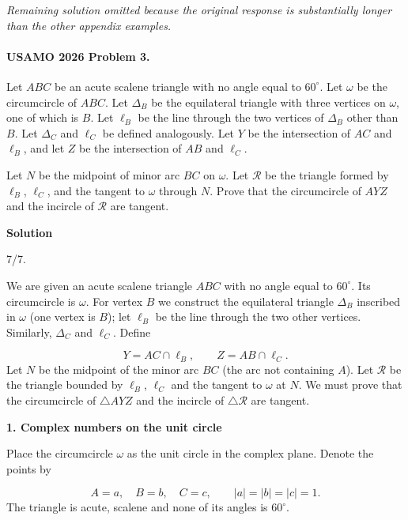\documentclass{llmxive}
\providecommand{\solutionheading}[1]{\par\smallskip\noindent\textbf{#1}\par}
\begin{document}
\par\noindent\textit{Remaining solution omitted because the original response is substantially longer than the other appendix examples.}\par
\par


\paragraph{USAMO 2026 Problem 3.}
\begin{mdframed}[style=mdpurplebox,frametitle={USAMO 2026 Problem 3}]
Let $ABC$ be an acute scalene triangle with no angle equal to $60^\circ$. Let $\omega$ be the circumcircle of $ABC$. Let $\Delta_B$ be the equilateral triangle with three vertices on $\omega$, one of which is $B$. Let $\ell_B$ be the line through the two vertices of $\Delta_B$ other than $B$. Let $\Delta_C$ and $\ell_C$ be defined analogously. Let $Y$ be the intersection of $AC$ and $\ell_B$, and let $Z$ be the intersection of $AB$ and $\ell_C$.

Let $N$ be the midpoint of minor arc $BC$ on $\omega$. Let $\mathcal{R}$ be the triangle formed by $\ell_B$, $\ell_C$, and the tangent to $\omega$ through $N$. Prove that the circumcircle of $AYZ$ and the incircle of $\mathcal{R}$ are tangent.
\end{mdframed}
\solutionheading{Solution}
\begin{remark*}
  7/7.
\end{remark*}
We are given an acute scalene triangle \(ABC\) with no angle equal to \(60^\circ\). Its circumcircle is \(\omega\). For vertex \(B\) we construct the equilateral triangle \(\Delta_B\) inscribed in \(\omega\) (one vertex is \(B\)); let \(\ell_B\) be the line through the two other vertices. Similarly, \(\Delta_C\) and \(\ell_C\). Define\par
\[
Y = AC \cap \ell_B,\qquad Z = AB \cap \ell_C.
\]
Let \(N\) be the midpoint of the minor arc \(BC\) (the arc not containing \(A\)). Let \(\mathcal{R}\) be the triangle bounded by \(\ell_B\), \(\ell_C\) and the tangent to \(\omega\) at \(N\). We must prove that the circumcircle of \(\triangle AYZ\) and the incircle of \(\triangle\mathcal{R}\) are tangent.\par
\smallskip
\solutionheading{1. Complex numbers on the unit circle}
Place the circumcircle \(\omega\) as the unit circle in the complex plane. Denote the points by\par
\[
A = a,\quad B = b,\quad C = c,\qquad |a|=|b|=|c|=1.
\]
The triangle is acute, scalene and none of its angles is \(60^\circ\).\par
\end{document}

